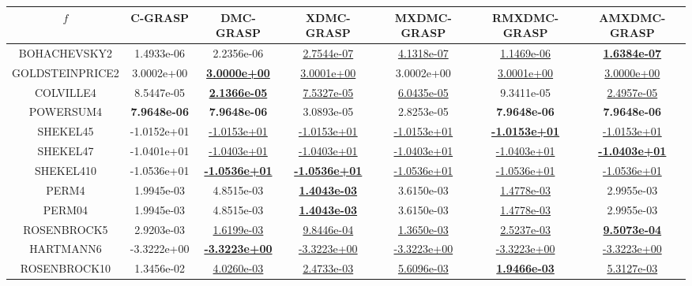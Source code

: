 \begin{table}[]
\begin{tabular}{|c|c|c|c|c|c|c|}
\hline
 $f$ & C-GRASP & DMC-GRASP & XDMC-GRASP & MXDMC-GRASP & RMXDMC-GRASP & AMXDMC-GRASP\\ \hline 
BOHACHEVSKY2 &  1.4933e-06 &  2.2356e-06 & \underline{ 2.7544e-07} & \underline{ 4.1318e-07} & \underline{ 1.1469e-06} & \underline{\textbf{1.6384e-07}}\\  
GOLDSTEINPRICE2 &  3.0002e+00 & \underline{\textbf{3.0000e+00}} & \underline{ 3.0001e+00} &  3.0002e+00 & \underline{ 3.0001e+00} & \underline{ 3.0000e+00}\\  
COLVILLE4 &  8.5447e-05 & \underline{\textbf{2.1366e-05}} & \underline{ 7.5327e-05} & \underline{ 6.0435e-05} &  9.3411e-05 & \underline{ 2.4957e-05}\\  
POWERSUM4 & \textbf{7.9648e-06} & \textbf{7.9648e-06} &  3.0893e-05 &  2.8253e-05 & \textbf{7.9648e-06} & \textbf{7.9648e-06}\\  
SHEKEL45 &  -1.0152e+01 & \underline{ -1.0153e+01} & \underline{ -1.0153e+01} & \underline{ -1.0153e+01} & \underline{\textbf{-1.0153e+01}} & \underline{ -1.0153e+01}\\  
SHEKEL47 &  -1.0401e+01 & \underline{ -1.0403e+01} & \underline{ -1.0403e+01} & \underline{ -1.0403e+01} & \underline{ -1.0403e+01} & \underline{\textbf{-1.0403e+01}}\\  
SHEKEL410 &  -1.0536e+01 & \underline{\textbf{-1.0536e+01}} & \underline{\textbf{-1.0536e+01}} & \underline{ -1.0536e+01} & \underline{ -1.0536e+01} & \underline{ -1.0536e+01}\\  
PERM4 &  1.9945e-03 &  4.8515e-03 & \underline{\textbf{1.4043e-03}} &  3.6150e-03 & \underline{ 1.4778e-03} &  2.9955e-03\\  
PERM04 &  1.9945e-03 &  4.8515e-03 & \underline{\textbf{1.4043e-03}} &  3.6150e-03 & \underline{ 1.4778e-03} &  2.9955e-03\\  
ROSENBROCK5 &  2.9203e-03 & \underline{ 1.6199e-03} & \underline{ 9.8446e-04} & \underline{ 1.3650e-03} & \underline{ 2.5237e-03} & \underline{\textbf{9.5073e-04}}\\  
HARTMANN6 &  -3.3222e+00 & \underline{\textbf{-3.3223e+00}} & \underline{ -3.3223e+00} & \underline{ -3.3223e+00} & \underline{ -3.3223e+00} & \underline{ -3.3223e+00}\\  
ROSENBROCK10 &  1.3456e-02 & \underline{ 4.0260e-03} & \underline{2.4733e-03} & \underline{ 5.6096e-03} & \underline{\textbf{1.9466e-03}} & \underline{ 5.3127e-03}\\  

\end{tabular}
\end{table}
